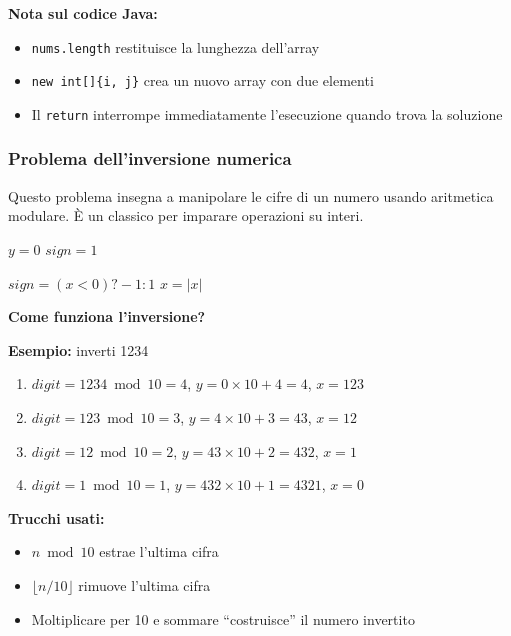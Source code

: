 \begin{nota}
	\textbf{Nota sul codice Java:}
	\begin{itemize}
		\item \texttt{nums.length} restituisce la lunghezza dell'array
		\item \texttt{new int[]\{i, j\}} crea un nuovo array con due elementi
		\item Il \texttt{return} interrompe immediatamente l'esecuzione quando trova la soluzione
	\end{itemize}
\end{nota}

\subsubsection*{Problema dell'inversione numerica}

\begin{softnote}
	Questo problema insegna a manipolare le cifre di un numero usando aritmetica modulare. È un classico per imparare operazioni su interi.
\end{softnote}

\begin{algorithm}[H]
	\caption{Inversione numerica}
	\label{alg:inversione}
	
	
	$y = 0$
	$sign = 1$
	
	$sign = (x < 0) ? -1 : 1$
	$x = |x|$
	
	
\end{algorithm}

\begin{softnote}
	\textbf{Come funziona l'inversione?}
	
	\textbf{Esempio:} inverti 1234
	\begin{enumerate}
		\item $digit = 1234 \bmod 10 = 4$, $y = 0 \times 10 + 4 = 4$, $x = 123$
		\item $digit = 123 \bmod 10 = 3$, $y = 4 \times 10 + 3 = 43$, $x = 12$
		\item $digit = 12 \bmod 10 = 2$, $y = 43 \times 10 + 2 = 432$, $x = 1$
		\item $digit = 1 \bmod 10 = 1$, $y = 432 \times 10 + 1 = 4321$, $x = 0$
	\end{enumerate}
	
	\textbf{Trucchi usati:}
	\begin{itemize}
		\item $n \bmod 10$ estrae l'ultima cifra
		\item $\lfloor n / 10 \rfloor$ rimuove l'ultima cifra
		\item Moltiplicare per 10 e sommare ``costruisce'' il numero invertito
	\end{itemize}
\end{softnote}


